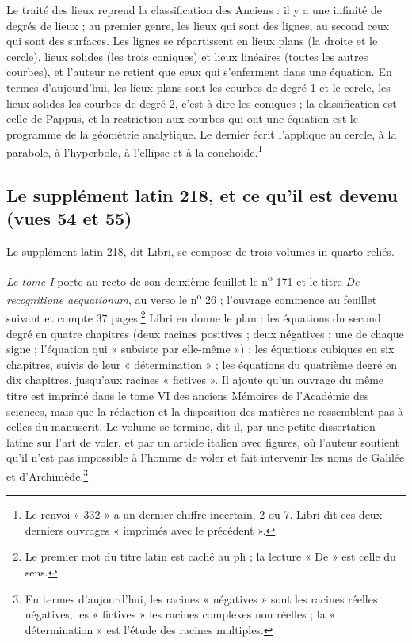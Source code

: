 \documentclass[11pt,a4paper]{article}
\begin{document}
Le traité des lieux reprend la classification des Anciens : il y a une
infinité de degrés de lieux ; au premier genre, les lieux qui sont des lignes,
au second ceux qui sont des surfaces. Les lignes se répartissent en lieux
plans (la droite et le cercle), lieux solides (les trois coniques) et lieux
linéaires (toutes les autres courbes), et l'auteur ne retient que ceux qui
s'enferment dans une équation. En termes d'aujourd'hui, les lieux plans sont
les courbes de degré 1 et le cercle, les lieux solides les courbes de degré 2,
c'est-à-dire les coniques ; la classification est celle de Pappus, et la
restriction aux courbes qui ont une équation est le programme de la géométrie
analytique. Le dernier écrit l'applique au cercle, à la parabole, à
l'hyperbole, à l'ellipse et à la conchoïde.\footnote{Le renvoi « 332 » a un
dernier chiffre incertain, 2 ou 7. Libri dit ces deux derniers ouvrages
« imprimés avec le précédent ».}

\subsection*{Le supplément latin 218, et ce qu'il est devenu (vues 54 et 55)}

Le supplément latin 218, dit Libri, se compose de trois volumes in-quarto
reliés.

\emph{Le tome I} porte au recto de son deuxième feuillet le
n\textsuperscript{o} 171 et le titre \emph{De recognitione aequationum}, au
verso le n\textsuperscript{o} 26 ; l'ouvrage commence au feuillet suivant et
compte 37 pages.\footnote{Le premier mot du titre latin est caché au pli ;
la lecture « De » est celle du sens.} Libri en donne le plan : les équations
du second degré en quatre chapitres (deux racines positives ; deux négatives ;
une de chaque signe ; l'équation qui « subsiste par elle-même ») ; les
équations cubiques en six chapitres, suivis de leur « détermination » ; les
équations du quatrième degré en dix chapitres, jusqu'aux racines
« fictives ». Il ajoute qu'un ouvrage du même titre est imprimé dans le tome
VI des anciens Mémoires de l'Académie des sciences, mais que la rédaction et
la disposition des matières ne ressemblent pas à celles du manuscrit. Le
volume se termine, dit-il, par une petite dissertation latine sur l'art de
voler, et par un article italien avec figures, où l'auteur soutient qu'il
n'est pas impossible à l'homme de voler et fait intervenir les noms de Galilée
et d'Archimède.\footnote{En termes d'aujourd'hui, les racines « négatives »
sont les racines réelles négatives, les « fictives » les racines complexes non
réelles ; la « détermination » est l'étude des racines multiples.}
\end{document}
